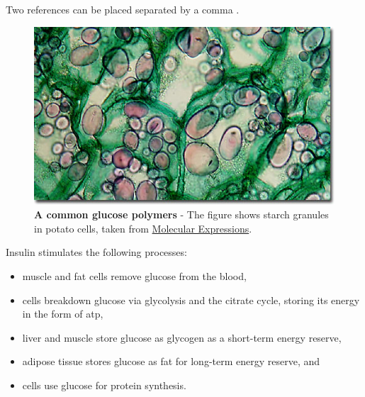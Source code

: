 Two references can be placed separated by a comma \cite{lastname07,name06}.




\begin{figure}[htb]
  \centering
  \includegraphics[width=1\columnwidth]{largepotato}
  \caption[A common glucose polymers]{\textbf{A common glucose polymers} - The figure shows starch granules in potato cells, taken from
  \href{http://molecularexpressions.com/micro/gallery/burgersnfries/burgersnfries4.html}{Molecular Expressions}.}
  \label{fig:largepotato}
\end{figure}



Insulin stimulates the following processes:

\begin{itemize}
\item muscle and fat cells remove glucose from the blood,
\item cells breakdown glucose via glycolysis and the citrate cycle, storing its energy in the form of \gls{atp},
\item liver and muscle store glucose as glycogen as a short-term energy reserve,
\item adipose tissue stores glucose as fat for long-term energy reserve, and
\item cells use glucose for protein synthesis.
\end{itemize}

